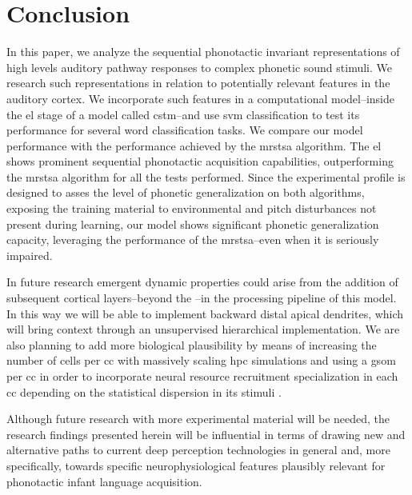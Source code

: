 {\section{Conclusion}

In this paper, we analyze the sequential phonotactic invariant representations of high levels auditory pathway responses to complex phonetic sound stimuli.  We research such representations in relation to potentially relevant features in the auditory cortex. We incorporate such features in a computational model--inside the \gls{el} stage of a model called \gls{cstm}--and use \gls{svm} classification to test its performance for several word classification tasks. We compare our model performance with the performance achieved by the \gls{mrstsa} algorithm. The \gls{el} shows prominent sequential phonotactic acquisition capabilities, outperforming the \gls{mrstsa} algorithm for all the tests performed. Since the experimental profile is designed to asses the level of phonetic generalization on both algorithms, exposing the training material to environmental and pitch disturbances not present during learning, our model shows significant phonetic generalization capacity, leveraging the performance of the \gls{mrstsa}--even when it is seriously impaired. 

In future research
emergent dynamic properties could arise from the addition of subsequent cortical layers--beyond the --in the processing pipeline of this model.  In this way we will be able to implement backward distal apical dendrites, which will bring context through an unsupervised hierarchical implementation. We are also planning to add more biological plausibility by means of increasing the number of cells per \gls{cc} with massively scaling \gls{hpc} simulations and using a \gls{gsom} per \gls{cc} in order to incorporate neural resource recruitment specialization in each \gls{cc} depending on the statistical dispersion in its stimuli \cite{Meyer19113}.

Although future research with more experimental material will be needed, the research findings presented herein will be influential in terms of drawing new and alternative paths to current deep perception technologies in general and, more specifically, towards specific neurophysiological features plausibly relevant for phonotactic infant language acquisition.

}










